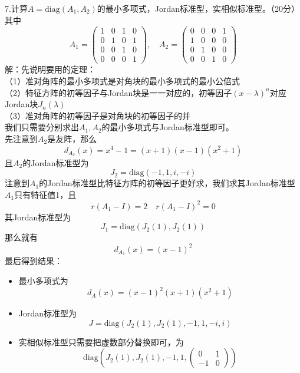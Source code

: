 \documentclass[UTF8]{ctexart}
\begin{document}
		
		
		
\noindent 7.计算$A = \text{diag}(A_1, A_2)$的最小多项式，Jordan标准型，实相似标准型。（20分）\\
其中
		\[
		A_1 = \begin{pmatrix} 
			1 & 0 & 1 & 0 \\ 
			0 & 1 & 0 & 1 \\ 
			0 & 0 & 1 & 0 \\ 
			0 & 0 & 0 & 1 
		\end{pmatrix}, \quad 
		A_2 = \begin{pmatrix} 
			0 & 0 & 0 & 1 \\ 
			1 & 0 & 0 & 0 \\ 
			0 & 1 & 0 & 0 \\ 
			0 & 0 & 1 & 0 
		\end{pmatrix}
		\]
解：先说明要用的定理：\\
（1）准对角阵的最小多项式是对角块的最小多项式的最小公倍式\\
（2）特征方阵的初等因子与Jordan块是一一对应的，初等因子$(x - \lambda)^n$对应Jordan块$J_n(\lambda)$\\
（3）准对角阵的初等因子是对角块的初等因子的并\\
我们只需要分别求出$A_1, A_2$的最小多项式与Jordan标准型即可。\\
先注意到$A_2$是友阵，那么
$$d_{A_2}(x) = x^4 - 1 = (x + 1)(x - 1)(x^2 + 1)$$
且$A_2$的Jordan标准型为
$$J_2 = \text{diag}(-1, 1, i, -i)$$
注意到$A_1$的Jordan标准型比特征方阵的初等因子更好求，我们求其Jordan标准型\\
$A_1$只有特征值1，且
$$r(A_1 - I) = 2\quad r(A_1 - I)^2 = 0$$
其Jordan标准型为
$$J_1 = \text{diag}(J_2(1), J_2(1))$$
那么就有
$$d_{A_1}(x) = (x - 1)^2$$
最后得到结果：
\begin{itemize}
			\item 最小多项式为$$d_A(x) = (x - 1)^2(x + 1)(x^2 + 1)$$
			\item Jordan标准型为$$J = \text{diag}(J_2(1), J_2(1), -1, 1, -i, i)$$
			\item 实相似标准型只需要把虚数部分替换即可，为$$\text{diag}\left(J_2(1), J_2(1), -1, 1, \begin{pmatrix} 0 & 1 \\ -1 & 0 \end{pmatrix}\right)$$
\end{itemize}
\end{document}
